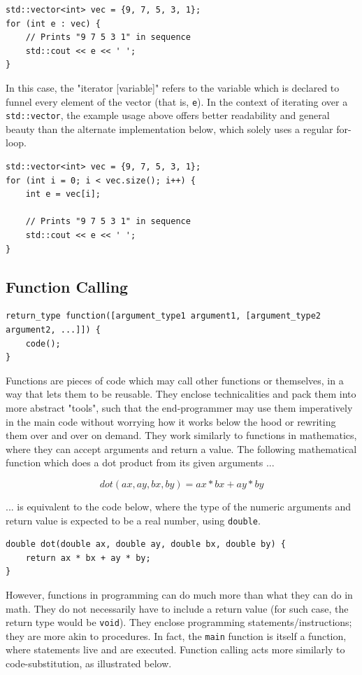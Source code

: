\documentclass[12pt]{article}
\begin{document}
\begin{verbatim}
std::vector<int> vec = {9, 7, 5, 3, 1};
for (int e : vec) {
    // Prints "9 7 5 3 1" in sequence
    std::cout << e << ' ';
}
\end{verbatim}

In this case, the "iterator [variable]" refers to the variable which is declared to funnel every element of the vector (that is, \texttt{e}). In the context of iterating over a \texttt{std::vector}, the example usage above offers better readability and general beauty than the alternate implementation below, which solely uses a regular for-loop.

\begin{verbatim}
std::vector<int> vec = {9, 7, 5, 3, 1};
for (int i = 0; i < vec.size(); i++) {
    int e = vec[i];

    // Prints "9 7 5 3 1" in sequence
    std::cout << e << ' ';
}
\end{verbatim}

\subsection{Function Calling}
\begin{verbatim}
return_type function([argument_type1 argument1, [argument_type2 argument2, ...]]) {
    code();
}
\end{verbatim}

Functions are pieces of code which may call other functions or themselves, in a way that lets them to be reusable. They enclose technicalities and pack them into more abstract "tools", such that the end-programmer may use them imperatively in the main code without worrying how it works below the hood or rewriting them over and over on demand. They work similarly to functions in mathematics, where they can accept arguments and return a value. The following mathematical function which does a dot product from its given arguments ...

$$dot(ax, ay, bx, by) = ax * bx + ay * by$$

... is equivalent to the code below, where the type of the numeric arguments and return value is expected to be a real number, using \texttt{double}.

\begin{verbatim}
double dot(double ax, double ay, double bx, double by) {
    return ax * bx + ay * by;
}
\end{verbatim}

However, functions in programming can do much more than what they can do in math. They do not necessarily have to include a return value (for such case, the return type would be \texttt{void}). They enclose programming statements/instructions; they are more akin to procedures. In fact, the \texttt{main} function is itself a function, where statements live and are executed. Function calling acts more similarly to code-substitution, as illustrated below.
\end{document}
